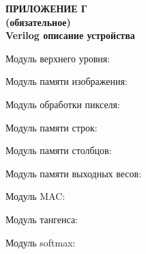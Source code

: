 {}%
\par

\normalsize
\begin{center}
  \textbf{ПРИЛОЖЕНИЕ Г} \\
  \textbf{(обязательное)} \\
  \textbf{Verilog описание устройства}
\end{center}

Модуль верхнего уровня:



Модуль памяти изображения:



Модуль обработки пикселя:




Модуль памяти строк:



Модуль памяти столбцов:



Модуль памяти выходных весов:



Модуль MAC:\@



Модуль тангенса:



Модуль softmax:



\pdfpagewidth=210mm
\pdfpageheight=297mm

